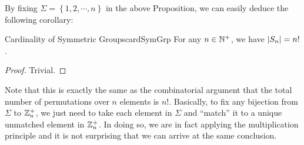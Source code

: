 \documentclass[math]{amznotes}
\theoremstyle{remark}
\newcommand{\0}{\mathbf{0}}
\newcommand{\1}{\mathbf{1}}
\begin{document}
By fixing $\Sigma = \left\{1, 2, \cdots, n\right\}$ in the above Proposition, we can easily deduce the following corollary:
\begin{corbox}{Cardinality of Symmetric Groups}{cardSymGrp}
    For any $n \in \mathbb{N}^+$, we have ${\left\lvert {S_n} \right\rvert} = n!$.
    \tcblower
    \begin{proof}
        Trivial.
    \end{proof}
\end{corbox}
Note that this is exactly the same as the combinatorial argument that the total number of permutations over $n$ elements is $n!$. Basically, to fix any bijection from $\Sigma$ to $\mathbb{Z}_n^+$, we just need to take each element in $\Sigma$ and ``match'' it to a unique unmatched element in $\mathbb{Z}_n^+$. In doing so, we are in fact applying the multiplication principle and it is not surprising that we can arrive at the same conclusion. 
\end{document}

